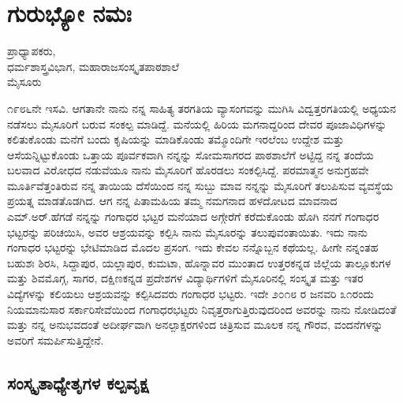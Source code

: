 {\fontsize{14}{16}\selectfont
\chapter{ಗುರುಭ್ಯೋ ನಮಃ}

\begin{center}
\smallskip

ಪ್ರಾಧ್ಯಾಪಕರು,\\ 
ಧರ್ಮಶಾಸ್ತ್ರವಿಭಾಗ, ಮಹಾರಾಜಸಂಸ್ಕೃತಪಾಠಶಾಲೆ\\ 
ಮೈಸೂರು
\addrule
\end{center}

೧೯೮೬ನೇ ಇಸವಿ. ಆಗತಾನೇ ನಾನು ನನ್ನ ಸಾಹಿತ್ಯ ತರಗತಿಯ ವ್ಯಾಸಂಗವನ್ನು ಮುಗಿಸಿ ವಿದ್ವತ್ತರಗತಿಯಲ್ಲಿ ಅಧ್ಯಯನ ನಡೆಸಲು ಮೈಸೂರಿಗೆ ಬರುವ ಸಂಕಲ್ಪ ಮಾಡಿದ್ದೆ. ಮನೆಯಲ್ಲಿ ಹಿರಿಯ ಮಗನಾದ್ದರಿಂದ ದೇವರ ಪೂಜಾವಿಧಿಗಳನ್ನು ಕಲಿತುಕೊಂಡು ಮನೆಗೆ ಬಂದು ಕೃಷಿಯನ್ನು ಮಾಡಿಕೊಂಡು ತಮ್ಮೊಂದಿಗೇ ಇರಲೆಂಬ ಉದ್ದೇಶ ಮತ್ತು ಆಸೆಯನ್ನಿಟ್ಟುಕೊಂಡು ಒತ್ತಾಯ ಪೂರ್ವಕವಾಗಿ ನನ್ನನ್ನು ಸೋಮಸಾಗರದ ಪಾಠಶಾಲೆಗೆ ಅಟ್ಟಿದ್ದ ನನ್ನ ತಂದೆಯ ಬಲವಾದ ವಿರೋಧದ ನಡುವೆಯೂ ನಾನು ಮೈಸೂರಿಗೆ ಹೊರಡಲು ಸಂಕಲ್ಪಿಸಿದ್ದೆ. ಪರಮಾತ್ಮನ ಅನುಗ್ರಹವೇ ಮೂರ್ತಿವೆತ್ತಂತಿರುವ ನನ್ನ ತಾಯಿಯ ದೆಸೆಯಿಂದ ನನ್ನ ಸುಬ್ಬು ಮಾವ ನನ್ನನ್ನು ಮೈಸೂರಿಗೆ ತಲುಪಿಸುವ ವ್ಯವಸ್ಥೆಯ ಪ್ರಯತ್ನ ಮಾಡತೊಡಗಿದ. ಆಗ ನನ್ನ ಪಿತಾಮಹಿಯ ತಮ್ಮ ನಮಗನಾದ ಹಳದೋಟದ ಮಾವನಾದ ಎಮ್.ಅರ್.ಹೆಗಡೆ ನನ್ನನ್ನು ಗಂಗಾಧರ ಭಟ್ಟರ ಮನೆಯಾದ ಅಗ್ಗೇರೆಗೆ ಕರೆದುಕೊಂಡು ಹೊಗಿ ನನಗೆ ಗಂಗಾಧರ ಭಟ್ಟರನ್ನು ಪರಿಚಯಿಸಿ, ಅವರ ಆಶ್ರಯವನ್ನು ಕಲ್ಪಿಸಿ ನಾನು ಮೈಸೂರನ್ನು ತಲುಪುವಂತಾಯಿತು. ಇದು ನಾನು ಗಂಗಾಧರ ಭಟ್ಟರನ್ನು ಭೇಟಿಮಾಡಿದ ಮೊದಲ ಪ್ರಸಂಗ. ಇದು ಕೇವಲ ನನ್ನೊಬ್ಬನ ಕಥೆಯಲ್ಲ. ಹೀಗೇ ನನ್ನಂತಹ ಬಹುಶಃ ಶಿರಸಿ, ಸಿದ್ದಾಪುರ, ಯಲ್ಲಾಪುರ, ಕುಮಟಾ, ಹೊನ್ನಾವರ ಮುಂತಾದ ಉತ್ತರಕನ್ನಡ ಜಿಲ್ಲೆಯ ತಾಲ್ಲೂಕುಗಳ ಮತ್ತು ಶಿವಮೊಗ್ಗ, ಸಾಗರ, ದಕ್ಷಿಣಕನ್ನಡ ಪ್ರದೇಶಗಳ ವಿದ್ಯಾರ್ಥಿಗಳಿಗೆ ಮೈಸೂರಿನಲ್ಲಿ ಸಂಸ್ಕೃತ ಮತ್ತು ಇತರ ವಿದ್ಯೆಗಳನ್ನು ಕಲಿಯಲು ಆಶ್ರಯವನ್ನು ಕಲ್ಪಿಸಿದವರು ಗಂಗಾಧರ ಭಟ್ಟರು. ಇದೇ ೨೦೧೮ ರ ಜನವರಿ ೩೧ರಂದು ನಿಯಮಾನುಸಾರ ಸರ್ಕಾರಿಸೇವೆಯಿಂದ ಗಂಗಾಧರಭಟ್ಟರು ನಿವೃತ್ತರಾಗುತ್ತಿರುವುದರಿಂದ ಅವರನ್ನು ನಾನು ನೋಡಿದಂತೆ ಮತ್ತು ನನ್ನ ಅನುಭವದಂತೆ ಅದೀರ್ಘವಾಗಿ ಅನಲ್ಪಾಕ್ಷರಗಳಿಂದ ಚಿತ್ರಿಸುವ ಮೂಲಕ ನನ್ನ ಗೌರವ, ವಂದನೆಗಳನ್ನು ಅವರಿಗೆ ಸಮರ್ಪಿಸುತ್ತಿದ್ದೇನೆ.

\section*{ಸಂಸ್ಕೃತಾಧ್ಯೇತೃಗಳ ಕಲ್ಪವೃಕ್ಷ}

}
